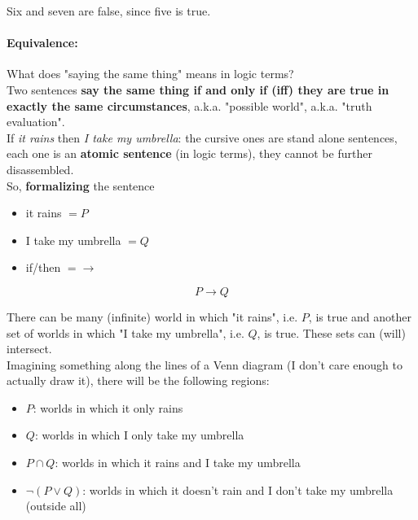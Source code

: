 	Six and seven are false, since five is true. \\


	\paragraph{Equivalence:} What does "saying the same thing" means in logic terms? \\
	Two sentences \textbf{say the same thing if and only if (iff) they are true in exactly the same circumstances}, a.k.a. "possible world", a.k.a. "truth evaluation". \\

	If \textit{it rains} then \textit{I take my umbrella}: the cursive ones are stand alone sentences, each one is an \textbf{atomic sentence} (in logic terms), they cannot be further disassembled. \\

	So, \textbf{formalizing} the sentence
	\begin{itemize}
		\item it rains $= P$
		\item I take my umbrella $= Q$
		\item if/then $= \rightarrow$
	\end{itemize}
	$$ P \rightarrow Q $$

	There can be many (infinite) world in which "it rains", i.e. $P$, is true and another set of worlds in which "I take my umbrella", i.e. $Q$, is true. These sets can (will) intersect.\\

	Imagining something along the lines of a Venn diagram (I don't care enough to actually draw it), there will be the following regions:
	\begin{itemize}
		\item $P$: worlds in which it only rains
		\item $Q$: worlds in which I only take my umbrella
		\item $P \cap Q$: worlds in which it rains and I take my umbrella
		\item $ \neg (P \vee Q)$: worlds in which it doesn't rain and I don't take my umbrella (outside all)
	\end{itemize}

